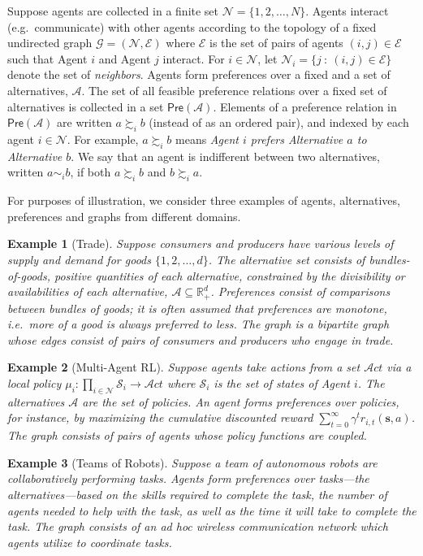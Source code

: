 \documentclass[conference]{ieeeconf}
\newcommand{\R}{\mathbb{R}}
\newcommand{\N}{\mathcal{N}}
\newcommand{\A}{\mathcal{A}}
\renewcommand{\SS}{\mathcal{S}}
\newcommand{\E}{\mathcal{E}}
\newcommand{\Pref}{\mathsf{Pre}}
\newcommand{\prefers}{\succsim}
\newcommand{\indif}{\sim}
\newcommand{\graph}{\mathcal{G}}
\newcommand{\Act}{\mathcal{A}ct}
\newtheorem{example}{Example}
\begin{document}
Suppose agents are collected in a finite set $\N = \{1,2,\dots,N\}$. Agents interact (e.g.~communicate) with other agents according to the topology of a fixed undirected graph $\graph = (\N,\E)$ where $\E$ is the set of pairs of agents $(i,j) \in \E$ such that Agent $i$ and Agent $j$ interact. For $i \in \N$, let $\N_i = \{ j~:~(i,j) \in \E\}$ denote the set of \emph{neighbors}. Agents form preferences over a fixed and a set of alternatives, $\A$. The set of all feasible preference relations over a fixed set of alternatives is collected in a set $\Pref(\A)$. Elements of a preference relation in $\Pref(\A)$ are written $a \prefers_i b$ (instead of as an ordered pair), and indexed by each agent $i \in \N$. For example, $a \prefers_i b$ means \emph{Agent $i$ prefers Alternative $a$ to Alternative $b$}. We say that an agent is indifferent between two alternatives, written $a \indif_i b$, if both $a \prefers_i b$ and $b \prefers_i a$.

For purposes of illustration, we consider three examples of agents, alternatives, preferences and graphs from different domains.

\begin{example}[Trade]
    Suppose consumers and producers have various levels of supply and demand for goods $\{1,2,\dots,d\}$. The alternative set consists of  bundles-of-goods, positive quantities of each alternative, constrained by the divisibility or availabilities of each alternative, $\A \subseteq \R^{d}_{+}$. Preferences consist of comparisons between bundles of goods; it is often assumed that preferences are monotone, i.e.~more of a good is always preferred to less. The graph is a bipartite graph whose edges consist of pairs of consumers and producers who engage in trade.
\end{example}
\begin{example}[Multi-Agent RL]
    Suppose agents take actions from a set $\Act$ via a local policy $\mu_i: \prod_{i \in \N} \SS_i \to \Act$ where $\SS_i$ is the set of states of Agent $i$. The alternatives $\A$ are the set of policies. An agent forms preferences over policies, for instance, by maximizing the cumulative discounted reward $\sum_{t=0}^{\infty} \gamma^t r_{i,t}(\mathbf{s},a)$. The graph consists of pairs of agents whose policy functions are coupled.
\end{example}
\begin{example}[Teams of Robots]
    Suppose a team of autonomous robots are collaboratively performing tasks. Agents form preferences over tasks---the alternatives---based on the skills required to complete the task, the number of agents needed to help with the task, as well as the time it will take to complete the task. The graph consists of an \emph{ad hoc} wireless communication network which agents utilize to coordinate tasks.
\end{example}
\end{document}
